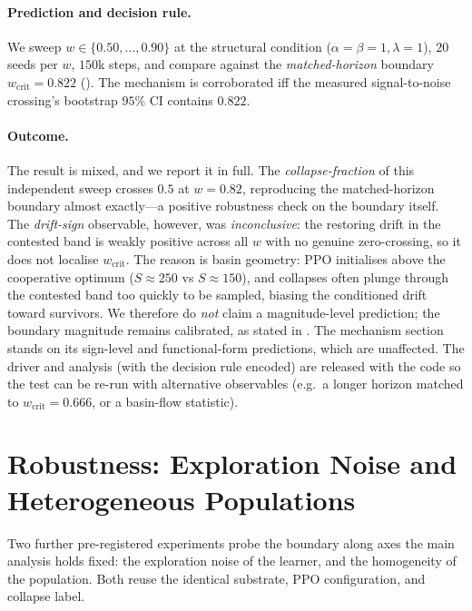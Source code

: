\documentclass[11pt]{article}
\newcommand{\wcrit}{w_{\mathrm{crit}}}
\begin{document}
\paragraph{Prediction and decision rule.} We sweep
$w\in\{0.50,\dots,0.90\}$ at the structural condition
($\alpha{=}\beta{=}1,\lambda{=}1$), $20$ seeds per $w$, $150$k steps, and
compare against the \emph{matched-horizon} boundary $\wcrit=0.822$
(). The mechanism is corroborated iff the
measured signal-to-noise crossing's bootstrap $95\%$ CI contains $0.822$.

\paragraph{Outcome.} The result is mixed, and we report it in full. The
\emph{collapse-fraction} of this independent sweep crosses $0.5$ at
$w=0.82$, reproducing the matched-horizon boundary almost exactly---a
positive robustness check on the boundary itself. The \emph{drift-sign}
observable, however, was \emph{inconclusive}: the restoring drift in the
contested band is weakly positive across all $w$ with no genuine
zero-crossing, so it does not localise $\wcrit$. The reason is basin
geometry: PPO initialises above the cooperative optimum ($S{\approx}250$ vs
$S{\approx}150$), and collapses often plunge through the contested band too
quickly to be sampled, biasing the conditioned drift toward survivors. We
therefore do \emph{not} claim a magnitude-level prediction; the boundary
magnitude remains calibrated, as stated in . The mechanism
section stands on its sign-level and functional-form predictions, which are
unaffected. The driver and analysis (with the decision rule encoded) are
released with the code so the test can be re-run with alternative
observables (e.g.\ a longer horizon matched to $\wcrit=0.666$, or a
basin-flow statistic).

\section{Robustness: Exploration Noise and Heterogeneous Populations}
\label{sec:appendix_robustness2}

Two further pre-registered experiments probe the boundary along axes the main
analysis holds fixed: the exploration noise of the learner, and the homogeneity
of the population. Both reuse the identical substrate, PPO configuration, and
collapse label.
\end{document}
